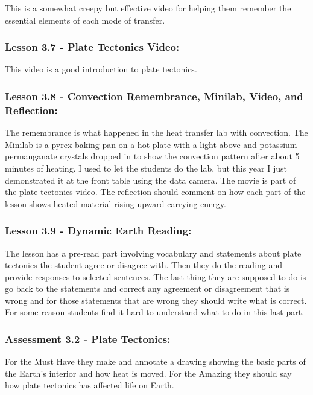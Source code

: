 \documentclass[11pt]{article}
\begin{document}
This is a somewhat creepy but effective video for
helping them remember the essential elements of each mode of transfer.


\subsubsection{Lesson 3.7 - Plate Tectonics Video:}
\label{sec:org8eff8f7}

This video is a good introduction to plate tectonics.


\subsubsection{Lesson 3.8 - Convection Remembrance, Minilab, Video, and Reflection:}
\label{sec:org4267255}

The remembrance is what happened in the heat transfer lab with convection. The Minilab is a
pyrex baking pan on a hot plate with a light above and potassium permanganate crystals
dropped in to show the convection pattern after about 5 minutes of heating. I used to let
the students do the lab, but this year I just demonstrated it at the front table using the
data camera. The movie is part of the plate tectonics video. The reflection should
comment on how each part of the lesson shows heated material rising upward carrying
energy.


\subsubsection{Lesson 3.9 - Dynamic Earth Reading:}
\label{sec:org123c628}

The lesson has a pre-read part involving vocabulary and statements about plate tectonics the student agree or disagree with.
Then they do the reading and provide responses to selected sentences. The last thing
they are supposed to do is go back to the statements and correct any agreement or
disagreement that is wrong and for those statements that are wrong they should write
what is correct. For some reason students find it hard to understand what to do in this
last part.


\subsubsection{Assessment 3.2 - Plate Tectonics:}
\label{sec:org978ddac}

For the Must Have they make and annotate a drawing showing the basic parts of the Earth’s interior and how heat is moved. For the Amazing they
should say how plate tectonics has affected life on Earth.
\end{document}
